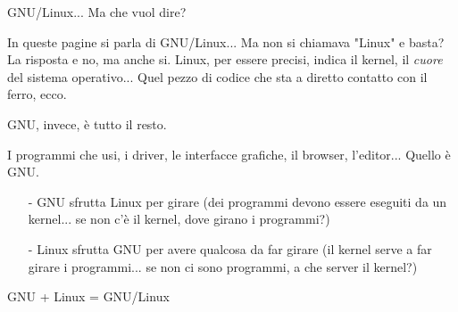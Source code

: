  {
\begin{slide}{GNU/Linux... Ma che vuol dire?}

 {
In queste pagine si parla di GNU/Linux... Ma non si chiamava "Linux" e
basta?
La risposta e no, ma anche si.
Linux, per essere precisi, indica il kernel, il \emph{cuore} del sistema
operativo... Quel pezzo di codice che sta a diretto contatto con il
ferro, ecco.

GNU, invece, è tutto il resto.

I programmi che usi, i driver, le interfacce grafiche, il browser,
l'editor... Quello è GNU.
}

 {
\begin{itemize}
	\item[-] GNU sfrutta Linux per girare (dei programmi devono
	essere eseguiti da un kernel... se non c'è il kernel, dove
	girano i programmi?)
	\item[-] Linux sfrutta GNU per avere qualcosa da far girare (il
	kernel serve a far girare i programmi... se non ci sono
	programmi, a che server il kernel?)
\end{itemize}

{\huge GNU + Linux = GNU/Linux }
}

\end{slide} }
